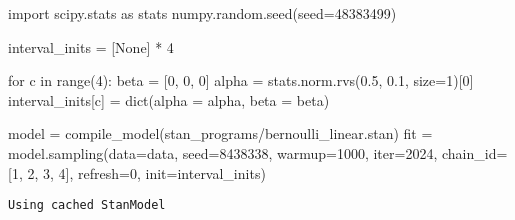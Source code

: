 \documentclass[
  letterpaper,
  DIV=11,
  numbers=noendperiod]{scrartcl}
\newenvironment{Shaded}{\begin{snugshade}}{\end{snugshade}}
\newcommand{\BuiltInTok}[1]{\textcolor[rgb]{0.00,0.23,0.31}{#1}}
\newcommand{\ControlFlowTok}[1]{\textcolor[rgb]{0.00,0.23,0.31}{#1}}
\newcommand{\DecValTok}[1]{\textcolor[rgb]{0.68,0.00,0.00}{#1}}
\newcommand{\FloatTok}[1]{\textcolor[rgb]{0.68,0.00,0.00}{#1}}
\newcommand{\ImportTok}[1]{\textcolor[rgb]{0.00,0.46,0.62}{#1}}
\newcommand{\KeywordTok}[1]{\textcolor[rgb]{0.00,0.23,0.31}{#1}}
\newcommand{\NormalTok}[1]{\textcolor[rgb]{0.00,0.23,0.31}{#1}}
\newcommand{\OperatorTok}[1]{\textcolor[rgb]{0.37,0.37,0.37}{#1}}
\newcommand{\StringTok}[1]{\textcolor[rgb]{0.13,0.47,0.30}{#1}}
\newcommand{\VariableTok}[1]{\textcolor[rgb]{0.07,0.07,0.07}{#1}}
\begin{document}
\begin{Shaded}
\begin{Highlighting}[]
\ImportTok{import}\NormalTok{ scipy.stats }\ImportTok{as}\NormalTok{ stats}
\NormalTok{numpy.random.seed(seed}\OperatorTok{=}\DecValTok{48383499}\NormalTok{)}

\NormalTok{interval\_inits }\OperatorTok{=}\NormalTok{ [}\VariableTok{None}\NormalTok{] }\OperatorTok{*} \DecValTok{4}

\ControlFlowTok{for}\NormalTok{ c }\KeywordTok{in} \BuiltInTok{range}\NormalTok{(}\DecValTok{4}\NormalTok{):}
\NormalTok{  beta }\OperatorTok{=}\NormalTok{ [}\DecValTok{0}\NormalTok{, }\DecValTok{0}\NormalTok{, }\DecValTok{0}\NormalTok{]}
\NormalTok{  alpha }\OperatorTok{=}\NormalTok{ stats.norm.rvs(}\FloatTok{0.5}\NormalTok{, }\FloatTok{0.1}\NormalTok{, size}\OperatorTok{=}\DecValTok{1}\NormalTok{)[}\DecValTok{0}\NormalTok{]}
\NormalTok{  interval\_inits[c] }\OperatorTok{=} \BuiltInTok{dict}\NormalTok{(alpha }\OperatorTok{=}\NormalTok{ alpha, beta }\OperatorTok{=}\NormalTok{ beta)}
\end{Highlighting}
\end{Shaded}

\begin{Shaded}
\begin{Highlighting}[]
\NormalTok{model }\OperatorTok{=}\NormalTok{ compile\_model(}\StringTok{\textquotesingle{}stan\_programs/bernoulli\_linear.stan\textquotesingle{}}\NormalTok{)}
\NormalTok{fit }\OperatorTok{=}\NormalTok{ model.sampling(data}\OperatorTok{=}\NormalTok{data, seed}\OperatorTok{=}\DecValTok{8438338}\NormalTok{, warmup}\OperatorTok{=}\DecValTok{1000}\NormalTok{, }\BuiltInTok{iter}\OperatorTok{=}\DecValTok{2024}\NormalTok{,}
\NormalTok{                     chain\_id}\OperatorTok{=}\NormalTok{[}\DecValTok{1}\NormalTok{, }\DecValTok{2}\NormalTok{, }\DecValTok{3}\NormalTok{, }\DecValTok{4}\NormalTok{], refresh}\OperatorTok{=}\DecValTok{0}\NormalTok{, init}\OperatorTok{=}\NormalTok{interval\_inits)}
\end{Highlighting}
\end{Shaded}

\begin{verbatim}
Using cached StanModel
\end{verbatim}
\end{document}
